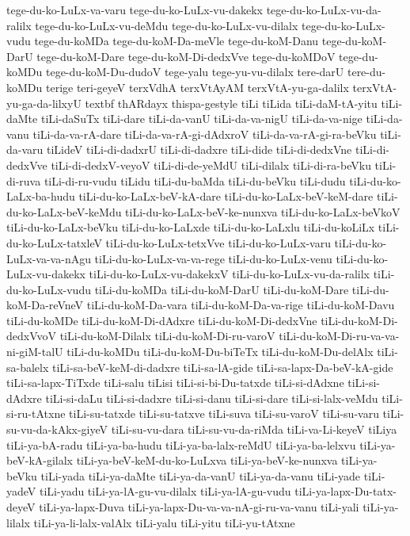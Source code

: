 {tege-du-ko-LuLx-va-varu
tege-du-ko-LuLx-vu-dakekx
tege-du-ko-LuLx-vu-da-ralilx
tege-du-ko-LuLx-vu-deMdu
tege-du-ko-LuLx-vu-dilalx
tege-du-ko-LuLx-vudu
tege-du-koMDa
tege-du-koM-Da-meVle
tege-du-koM-Danu
tege-du-koM-DarU
tege-du-koM-Dare
tege-du-koM-Di-dedxVve
tege-du-koMDoV
tege-du-koMDu
tege-du-koM-Du-dudoV
tege-yalu
tege-yu-vu-dilalx
tere-darU
tere-du-koMDu
terige
teri-geyeV
terxVdhA
terxVtAyAM
terxVtA-yu-ga-dalilx
terxVtA-yu-ga-da-lilxyU
textbf
thARdayx
thispa-gestyle
tiLi
tiLida
tiLi-daM-tA-yitu
tiLi-daMte
tiLi-daSuTx
tiLi-dare
tiLi-da-vanU
tiLi-da-va-nigU
tiLi-da-va-nige
tiLi-da-vanu
tiLi-da-va-rA-dare
tiLi-da-va-rA-gi-dAdxroV
tiLi-da-va-rA-gi-ra-beVku
tiLi-da-varu
tiLideV
tiLi-di-dadxrU
tiLi-di-dadxre
tiLi-dide
tiLi-di-dedxVne
tiLi-di-dedxVve
tiLi-di-dedxV-veyoV
tiLi-di-de-yeMdU
tiLi-dilalx
tiLi-di-ra-beVku
tiLi-di-ruva
tiLi-di-ru-vudu
tiLidu
tiLi-du-baMda
tiLi-du-beVku
tiLi-dudu
tiLi-du-ko-LaLx-ba-hudu
tiLi-du-ko-LaLx-beV-kA-dare
tiLi-du-ko-LaLx-beV-keM-dare
tiLi-du-ko-LaLx-beV-keMdu
tiLi-du-ko-LaLx-beV-ke-nunxva
tiLi-du-ko-LaLx-beVkoV
tiLi-du-ko-LaLx-beVku
tiLi-du-ko-LaLxde
tiLi-du-ko-LaLxlu
tiLi-du-koLiLx
tiLi-du-ko-LuLx-tatxleV
tiLi-du-ko-LuLx-tetxVve
tiLi-du-ko-LuLx-varu
tiLi-du-ko-LuLx-va-va-nAgu
tiLi-du-ko-LuLx-va-va-rege
tiLi-du-ko-LuLx-venu
tiLi-du-ko-LuLx-vu-dakekx
tiLi-du-ko-LuLx-vu-dakekxV
tiLi-du-ko-LuLx-vu-da-ralilx
tiLi-du-ko-LuLx-vudu
tiLi-du-koMDa
tiLi-du-koM-DarU
tiLi-du-koM-Dare
tiLi-du-koM-Da-reVneV
tiLi-du-koM-Da-vara
tiLi-du-koM-Da-va-rige
tiLi-du-koM-Davu
tiLi-du-koMDe
tiLi-du-koM-Di-dAdxre
tiLi-du-koM-Di-dedxVne
tiLi-du-koM-Di-dedxVvoV
tiLi-du-koM-Dilalx
tiLi-du-koM-Di-ru-varoV
tiLi-du-koM-Di-ru-va-va-ni-giM-talU
tiLi-du-koMDu
tiLi-du-koM-Du-biTeTx
tiLi-du-koM-Du-delAlx
tiLi-sa-balelx
tiLi-sa-beV-keM-di-dadxre
tiLi-sa-lA-gide
tiLi-sa-lapx-Da-beV-kA-gide
tiLi-sa-lapx-TiTxde
tiLi-salu
tiLisi
tiLi-si-bi-Du-tatxde
tiLi-si-dAdxne
tiLi-si-dAdxre
tiLi-si-daLu
tiLi-si-dadxre
tiLi-si-danu
tiLi-si-dare
tiLi-si-lalx-veMdu
tiLi-si-ru-tAtxne
tiLi-su-tatxde
tiLi-su-tatxve
tiLi-suva
tiLi-su-varoV
tiLi-su-varu
tiLi-su-vu-da-kAkx-giyeV
tiLi-su-vu-dara
tiLi-su-vu-da-riMda
tiLi-va-Li-keyeV
tiLiya
tiLi-ya-bA-radu
tiLi-ya-ba-hudu
tiLi-ya-ba-lalx-reMdU
tiLi-ya-ba-lelxvu
tiLi-ya-beV-kA-gilalx
tiLi-ya-beV-keM-du-ko-LuLxva
tiLi-ya-beV-ke-nunxva
tiLi-ya-beVku
tiLi-yada
tiLi-ya-daMte
tiLi-ya-da-vanU
tiLi-ya-da-vanu
tiLi-yade
tiLi-yadeV
tiLi-yadu
tiLi-ya-lA-gu-vu-dilalx
tiLi-ya-lA-gu-vudu
tiLi-ya-lapx-Du-tatx-deyeV
tiLi-ya-lapx-Duva
tiLi-ya-lapx-Du-va-va-nA-gi-ru-va-vanu
tiLi-yali
tiLi-ya-lilalx
tiLi-ya-li-lalx-valAlx
tiLi-yalu
tiLi-yitu
tiLi-yu-tAtxne
}
